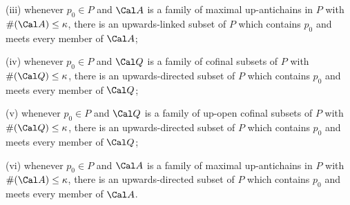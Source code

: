 (iii) whenever $p_0\in P$ and $\Cal A$ is a family of maximal
up-antichains in $P$ with $\#(\Cal A)\le\kappa$, there is an
upwards-linked subset of $P$ which contains $p_0$ and meets every member
of $\Cal A$;

(iv) whenever $p_0\in P$ and $\Cal Q$ is a family of cofinal subsets of
$P$ with $\#(\Cal Q)\le\kappa$, there is an upwards-directed subset of
$P$ which contains $p_0$ and meets every member of $\Cal Q$;

(v) whenever $p_0\in P$ and $\Cal Q$ is a family of up-open cofinal
subsets of $P$ with $\#(\Cal Q)\le\kappa$, there is an upwards-directed
subset of $P$ which contains $p_0$ and meets every member of $\Cal Q$;

(vi) whenever $p_0\in P$ and $\Cal A$ is a family of maximal
up-antichains in $P$ with $\#(\Cal A)\le\kappa$, there is an
upwards-directed subset of $P$ which contains $p_0$ and meets every
member of $\Cal A$.

